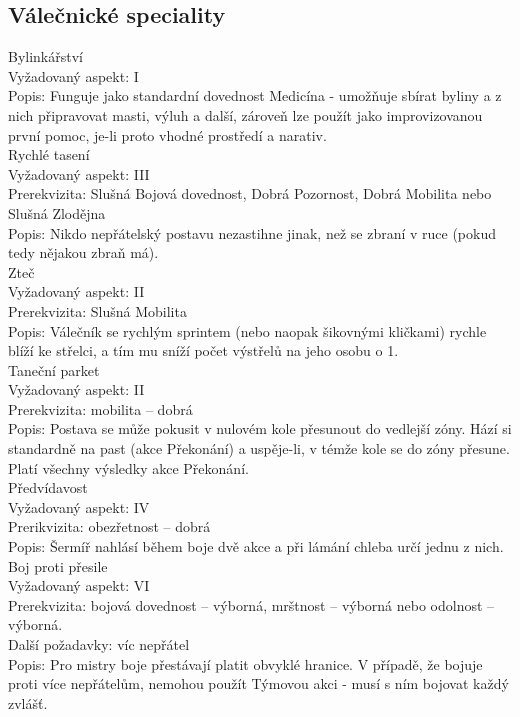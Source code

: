 \documentclass[../../main.tex]{subfiles}
\begin{document}
\subsection{Válečnické speciality}
\label{sec:val-spec-sub}

Bylinkářství \\
Vyžadovaný aspekt: I\\
Popis: Funguje jako standardní dovednost Medicína - umožňuje sbírat byliny a z nich připravovat masti, výluh a další, zároveň lze použít jako improvizovanou první pomoc, je-li proto vhodné prostředí a narativ.\\


Rychlé tasení\\
Vyžadovaný aspekt: III\\
Prerekvizita: Slušná Bojová dovednost, Dobrá Pozornost, Dobrá Mobilita nebo Slušná Zlodějna \\
Popis: Nikdo nepřátelský postavu nezastihne jinak, než se zbraní v ruce (pokud tedy nějakou zbraň má).\\


Zteč \\
Vyžadovaný aspekt: II\\
Prerekvizita: Slušná Mobilita\\
Popis: Válečník se rychlým sprintem (nebo naopak šikovnými kličkami) rychle blíží ke střelci, a tím mu sníží počet výstřelů na jeho osobu o 1.\\


Taneční parket \\
Vyžadovaný aspekt: II\\
Prerekvizita: mobilita – dobrá\\
Popis: Postava se může pokusit v nulovém kole přesunout do vedlejší zóny. Hází si standardně na past (akce Překonání) a uspěje-li, v témže kole se do zóny přesune. Platí všechny výsledky akce Překonání.\\


Předvídavost \\
Vyžadovaný aspekt: IV\\
Prerikvizita: obezřetnost – dobrá\\
Popis: Šermíř nahlásí během boje dvě akce a při lámání chleba určí jednu z nich. \\



Boj proti přesile\\
Vyžadovaný aspekt: VI\\
Prerekvizita: bojová dovednost – výborná, mrštnost – výborná nebo odolnost – výborná.\\
Další požadavky: víc nepřátel\\
Popis: Pro mistry boje přestávají platit obvyklé hranice. V případě, že bojuje proti více nepřátelům, nemohou použít Týmovou akci - musí s ním bojovat každý zvlášť.\\
\end{document}
